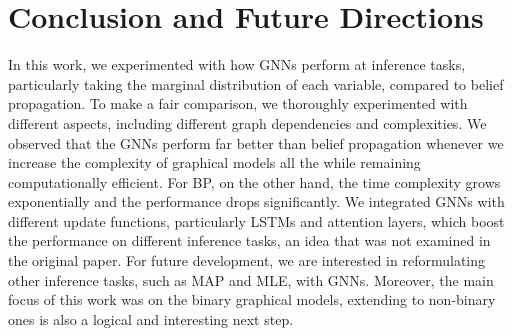 \documentclass{article}
\newcommand{\anita}[1]{\textcolor{bittersweet}{[Anita : #1]}}
\begin{document}
\section{Conclusion and Future Directions}
In this work, we experimented with how GNNs perform at inference tasks, particularly taking the marginal distribution of each variable, compared to belief propagation. To make a fair comparison, we thoroughly experimented with different aspects, including different graph dependencies and complexities. We observed that the GNNs perform far better than belief propagation whenever we increase the complexity of graphical models all the while remaining computationally efficient. For BP, on the other hand, the time complexity grows exponentially and the performance drops significantly. We integrated GNNs with different update functions, particularly LSTMs and attention layers, which boost the performance on different inference tasks, an idea that was not examined in the original paper. For future development, we are interested in reformulating other inference tasks, such as MAP and MLE, with GNNs. Moreover, the main focus of this work was on the binary graphical models, extending to non-binary ones is also a logical and interesting next step.






\end{document}
